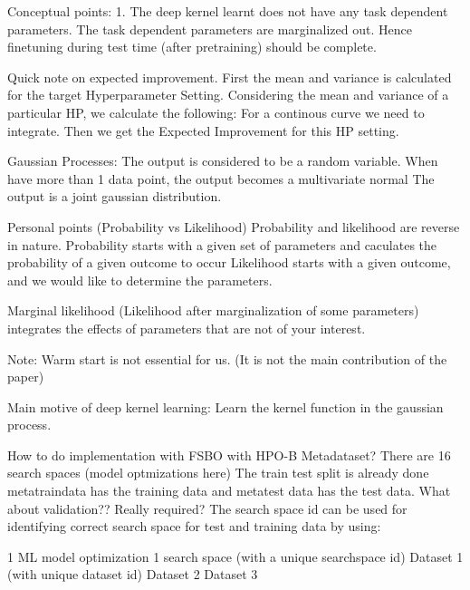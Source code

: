 \documentclass[11pt]{report}
\begin{document}
Conceptual points:
    1. The deep kernel learnt does not have any task dependent parameters.
       The task dependent parameters are marginalized out.
       Hence finetuning during test time (after pretraining) should be complete.

Quick note on expected improvement.
    First the mean and variance is calculated for the target Hyperparameter Setting.
    Considering the mean and variance of a particular HP, we calculate the following:
        For a continous curve we need to integrate.
    Then we get the Expected Improvement for this HP setting.


Gaussian Processes:
    The output is considered to be a random variable.
    When have more than 1 data point, the output becomes a multivariate normal
        The output is a joint gaussian distribution.

Personal points (Probability vs Likelihood)
    Probability and likelihood are reverse in nature.
    Probability starts with a given set of parameters and caculates the probability of a given outcome to occur
    Likelihood starts with a given outcome, and we would like to determine the parameters.

    Marginal likelihood (Likelihood after marginalization of some parameters)
        integrates the effects of parameters that are not of your interest.

Note:
    Warm start is not essential for us. (It is not the main contribution of the paper)

Main motive of deep kernel learning:
    Learn the kernel function in the gaussian process.

How to do implementation with FSBO with HPO-B Metadataset?
There are 16 search spaces (model optmizations here)
    The train test split is already done metatraindata has the training data and metatest data has the test data.
    What about validation?? Really required?
    The search space id can be used for identifying correct search space for test and training data by using:

1 ML model optimization
    1 search space (with a unique searchspace id)
        Dataset 1 (with unique dataset id)
        Dataset 2
        Dataset 3
\end{document}
